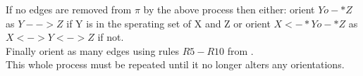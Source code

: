 \documentclass{article}
\begin{document}
If no edges are removed from $\pi$ by the above process then either: orient $Yo-*Z$ as $Y-->Z$ if Y is in the sperating set of X and Z or orient $X<-*Yo-*Z$ as $X<->Y<->Z$ if not.
\\

Finally orient as many edges using rules $R5-R10$ from \cite{ZHANG20081873}.
\\

This whole process must be repeated until it no longer alters any orientations.\cite{colombo2012learning}

{}

\end{document}
